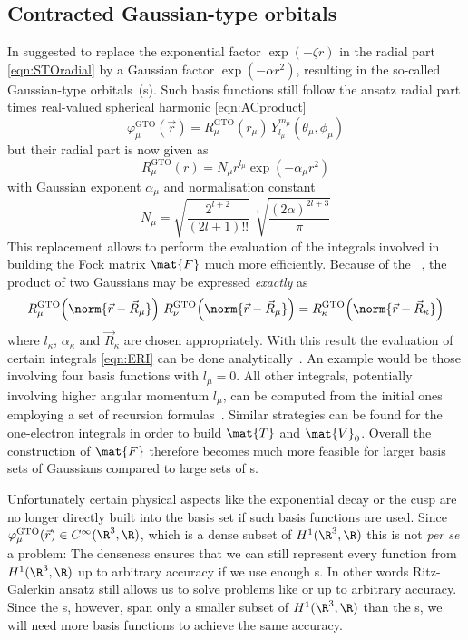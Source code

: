 \subsection{Contracted Gaussian-type orbitals}
\label{sec:cGTO}

In \citeyear{Boys1950} \citeauthor{Boys1950} suggested to replace
the exponential factor $\exp(- \zeta r)$ in the radial part \eqref{eqn:STOradial}
by a Gaussian factor $\exp(-\alpha r^2)$,
resulting in the so-called Gaussian-type orbitals~({\GTO}s).
Such \GTO basis functions still follow the ansatz radial part times real-valued spherical harmonic
\eqref{eqn:ACproduct}
\begin{equation}
	\varphi^\text{GTO}_\mu(\vec{r}) =
	R^\text{GTO}_\mu(r_\mu) \, Y_{l_\mu}^{m_\mu}(\theta_\mu, \phi_\mu)
	\label{eqn:ACproduct}
\end{equation}
but their radial part is now given as
\begin{equation}
	R^\text{GTO}_\mu(r) = N_\mu r^{l_\mu} \exp(-\alpha_\mu r^2)
	\label{eqn:GTOradial}
\end{equation}
with Gaussian exponent $\alpha_\mu$ and normalisation constant
\[
	N_\mu =  \sqrt{\frac{2^{l+2}}{(2l+1)!!}} \, \sqrt[4]{\frac{(2\alpha)^{2l+3}}{\pi}}
\]
This replacement allows to perform the
evaluation of the integrals involved in building the Fock matrix $\mat{F}$
much more efficiently.
Because of the %
~\cite{Boys1950,Szabo1996,Besalu2011},
the product of two Gaussians may be expressed \emph{exactly} as
\[
	R^\text{GTO}_\mu\!\left( \norm{\vec{r} - \vec{R}_\mu}\right)
	\,
	R^\text{GTO}_\nu\!\left( \norm{\vec{r} - \vec{R}_\mu}\right)
	= R^\text{GTO}_\kappa\!\left( \norm{\vec{r} - \vec{R}_\kappa}\right)
\]
where $l_\kappa$, $\alpha_\kappa$ and $\vec{R}_\kappa$ are chosen appropriately.
With this result the evaluation of certain \ERI integrals \eqref{eqn:ERI}
can be done analytically~\cite{Boys1950}.
An example would be those involving four basis functions with $l_\mu = 0$.
All other \ERI integrals, potentially involving higher angular momentum $l_\mu$,
can be computed from the initial ones employing
a set of recursion formulas~\cite{Gill1994}.
Similar strategies can be found for the one-electron integrals
in order to build $\mat{T}$ and $\mat{V}_0$.
Overall the construction of $\mat{F}$ therefore becomes much more
feasible for larger basis sets of Gaussians compared to large sets of {\STO}s.

Unfortunately certain physical aspects like the exponential decay
or the cusp are no longer directly built into the basis set
if such \GTO basis functions are used.
Since $\varphi^\text{GTO}_\mu(\vec{r}) \in C^\infty(\R^3, \R)$,
which is a dense subset of $H^1(\R^3, \R)$
this is not \textit{per se} a problem:
The denseness ensures that we can still represent every function
from $H^1(\R^3, \R)$ up to arbitrary accuracy if we use enough {\GTO}s.
In other words Ritz-Galerkin ansatz still allows us to
solve problems like \HF or \FCI up to arbitrary accuracy.
Since the {\GTO}s, however,
span only a smaller subset of $H^1(\R^3, \R)$ than the {\STO}s,
we will need more \GTO basis functions to achieve the same accuracy.

